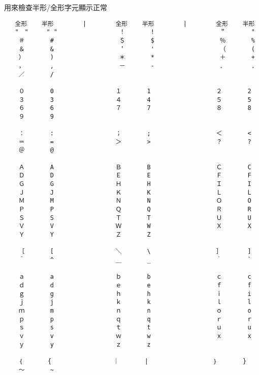 %
%
%

用來檢查半形/全形字元顯示正常\\

\begin{verbatim}
   全形    半形        |        全形    半形        |        全形    半形
   "　"     " "                 ！       !                  ＂       "
    ＃       #                  ＄       $                  ％       %
    ＆       &                  ＇       '                  （       (
    ）       )                  ＊       *                  ＋       +
    ，       ,                  －       -                  ．       .
    ／       /

    ０       0                 １       1                  ２       2
    ３       3                 ４       4                  ５       5
    ６       6                 ７       7                  ８       8
    ９       9

    ：       :                 ；       ;                  ＜       <
    ＝       =                 ＞       >                  ？       ?
    ＠       @

    Ａ       A                 Ｂ       B                  Ｃ       C
    Ｄ       D                 Ｅ       E                  Ｆ       F
    Ｇ       G                 Ｈ       H                  Ｉ       I
    Ｊ       J                 Ｋ       K                  Ｌ       L
    Ｍ       M                 Ｎ       N                  Ｏ       O
    Ｐ       P                 Ｑ       Q                  Ｒ       R
    Ｓ       S                 Ｔ       T                  Ｕ       U
    Ｖ       V                 Ｗ       W                  Ｘ       X
    Ｙ       Y                 Ｚ       Z

    ［       [                 ＼       \                  ］       ]
    ＾       ^                 ＿       _                  ｀       `

    ａ       a                 ｂ       b                  ｃ       c
    ｄ       d                 ｅ       e                  ｆ       f
    ｇ       g                 ｈ       h                  ｉ       i
    ｊ       j                 ｋ       k                  ｌ       l
    ｍ       m                 ｎ       n                  ｏ       o
    ｐ       p                 ｑ       q                  ｒ       r
    ｓ       s                 ｔ       t                  ｕ       u
    ｖ       v                 ｗ       w                  ｘ       x
    ｙ       y                 ｚ       z

    ｛       {                 ｜       |                  ｝       }
    ～       ~
\end{verbatim}

